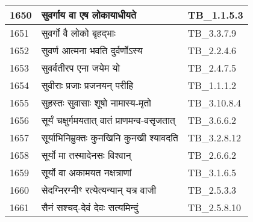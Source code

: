 \documentclass[17pt]{extarticle}
\begin{document}
\begin{longtable}{||p{0.4in}||p{4.9in}||p{0.9in}||}
    \hline
        
    1650 & सुवर्गाय वा एष लोकायाधीयते & TB\_1.1.5.3       \\
    
    \hline
        
    1651 & सुवर्गो वै लोको बृहद्भाः & TB\_3.3.7.9       \\
    
    \hline
        
    1652 & सुवर्ण आत्मना भवति दुर्वर्णोऽस्य & TB\_2.2.4.6       \\
    
    \hline
        
    1653 & सुवर्वतीरप एना जयेम यो & TB\_2.4.7.5       \\
    
    \hline
        
    1654 & सुवीराः प्रजाः प्रजनयन् परीहि & TB\_1.1.1.2       \\
    
    \hline
        
    1655 & सुहस्तः सुवासाः शूषो नामास्य{-}मृतो & TB\_3.10.8.4       \\
    
    \hline
        
    1656 & सूर्यं चक्षुर्गमयतात् वातं प्राणमन्व{-}वसृजतात् & TB\_3.6.6.2       \\
    
    \hline
        
    1657 & सूर्याभिनिम्रुक्तः कुनखिनि कुनखी श्यावदति & TB\_3.2.8.12       \\
    
    \hline
        
    1658 & सूर्यो मा तस्मादेनसः विश्वान् & TB\_2.6.6.2       \\
    
    \hline
        
    1659 & सूर्यो वा अकामयत नक्षत्राणां & TB\_3.1.6.5       \\
    
    \hline
        
    1660 & सेदग्निरग्नीꣳ रत्येत्यन्यान् यत्र वाजी & TB\_2.5.3.3       \\
    
    \hline
        
    1661 & सैनं सश्चद्{-}देवं देवः सत्यमिन्दुं & TB\_2.5.8.10       \\
    
    \hline
        

\end{longtable}
\end{document}
